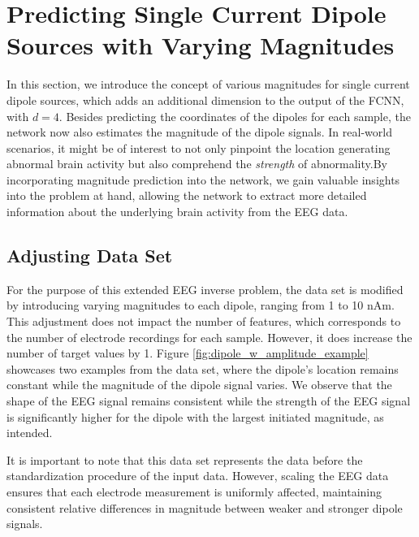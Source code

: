 \documentclass[a4paper, UKenglish, 11pt]{uiomaster}
\begin{document}
\section{Predicting Single Current Dipole Sources with Varying Magnitudes} \label{sec:result_magnitude}

In this section, we introduce the concept of various magnitudes for single current dipole sources, which adds an additional dimension to the output of the FCNN, with $d=4$. Besides predicting the coordinates of the dipoles for each sample, the network now also estimates the magnitude of the dipole signals. In real-world scenarios, it might be of interest to not only pinpoint the location generating  abnormal brain activity but also comprehend the \emph{strength} of abnormality.By incorporating magnitude prediction into the network, we gain valuable insights into the problem at hand, allowing the network to extract more detailed information about the underlying brain activity from the EEG data.


\subsection{Adjusting Data Set}
For the purpose of this extended EEG inverse problem, the data set is modified by introducing varying magnitudes to each dipole, ranging from 1 to 10 nAm. This adjustment does not impact the number of features, which corresponds to the number of electrode recordings for each sample. However, it does increase the number of target values by 1. Figure \ref{fig:dipole_w_amplitude_example} showcases two examples from the data set, where the dipole's location remains constant while the magnitude of the dipole signal varies. We observe that the shape of the EEG signal remains consistent while the strength of the EEG signal is significantly higher for the dipole with the largest initiated magnitude, as intended.

It is important to note that this data set represents the data before the standardization procedure of the input data. However, scaling the EEG data ensures that each electrode measurement is uniformly affected, maintaining consistent relative differences in magnitude between weaker and stronger dipole signals.
\end{document}
